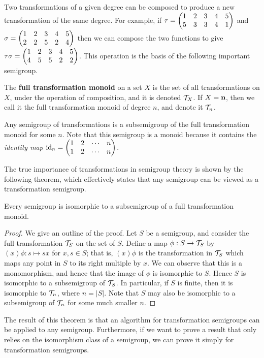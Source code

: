 Two transformations of a given degree can be composed to produce a new
transformation of the same degree.  For example, if $\tau = \begin{pmatrix} 1 & 2 & 3 & 4 & 5 \\ 5 & 3 & 3 & 4 & 1 \end{pmatrix}$ and
$\sigma = \begin{pmatrix} 1 & 2 & 3 & 4 & 5 \\ 2 & 2 & 5 & 2 & 4 \end{pmatrix}$ then we can compose the two functions to give
$\tau\sigma = \begin{pmatrix} 1 & 2 & 3 & 4 & 5 \\ 4 & 5 & 5 & 2 & 2 \end{pmatrix}$.  This operation is the basis of the following
important semigroup.

\begin{definition}
  \label{def:tn}
  The \textbf{full transformation monoid} on a set $X$ is the
  set of all transformations on $X$, under the operation of composition, and it
  is denoted $\mathcal{T}_X$.  If $X = \mathbf{n}$, then we call it the full transformation
  monoid of degree $n$, and denote it $\mathcal{T}_n$.
\end{definition}

Any semigroup of transformations is a subsemigroup of the full transformation
monoid for some $n$.  Note that this semigroup is a monoid because it contains
the \textit{identity map} $\operatorname{id}_n = \begin{pmatrix} 1 & 2 & \cdots & n \\ 1 & 2 & \cdots & n \end{pmatrix}$.

The true importance of transformations in semigroup theory is shown by the
following theorem, which effectively states that any semigroup can be viewed as
a transformation semigroup.

\begin{theorem}
  \label{thm:cayley-semigroups}
  Every semigroup is isomorphic to a subsemigroup of a full transformation
  monoid.
  \begin{proof}
    We give an outline of the proof.  Let $S$ be a semigroup, and consider the
    full transformation $\mathcal{T}_S$ on the set of $S$.  Define a map
    $\phi: S \to \mathcal{T}_S$ by $(x)\phi: s \mapsto sx$ for $x,s \in S$; that is,
    $(x)\phi$ is the transformation in $\mathcal{T}_S$ which maps any point in $S$ to its
    right multiple by $x$.  We can observe that this is a monomorphism, and
    hence that the image of $\phi$ is isomorphic to $S$.  Hence $S$ is
    isomorphic to a subsemigroup of $\mathcal{T}_S$.  In particular, if $S$ is finite,
    then it is isomorphic to $\mathcal{T}_n$, where $n = |S|$.  Note that $S$ may also be
    isomorphic to a subsemigroup of $\mathcal{T}_n$ for some much smaller $n$.
  \end{proof}
\end{theorem}

The result of this theorem is that an algorithm for transformation semigroups
can be applied to any semigroup.  Furthermore, if we want to prove a result that
only relies on the isomorphism class of a semigroup, we can prove it simply for
transformation semigroups.

